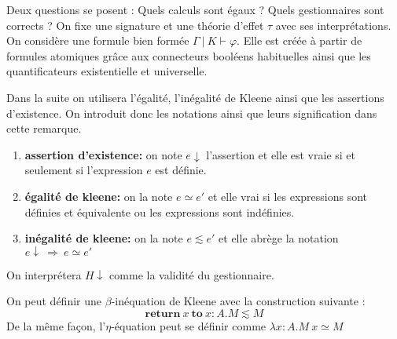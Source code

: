 Deux questions se posent : Quels calculs sont égaux ? Quels gestionnaires sont corrects ?
\smallbreak
On fixe une signature et une théorie d'effet $\tau$ avec ses interprétations. On considère une formule bien formée $\Gamma~|~K \vdash \varphi$. Elle est créée à partir de formules atomiques grâce aux connecteurs booléens habituelles ainsi que les quantificateurs existentielle et universelle.

\begin{remark}
	Dans la suite on utilisera l'égalité, l'inégalité de Kleene ainsi que les assertions d'existence. On introduit donc les notations ainsi que leurs signification dans cette remarque.
	
	\begin{enumerate}
		\item[] \textbf{assertion d'existence:} on note $e \downarrow$ l'assertion et elle est vraie si et seulement si l'expression $e$ est définie.
		\item[] \textbf{égalité de kleene:} on la note $e \simeq e'$ et elle vrai si les expressions sont définies et équivalente ou les expressions sont indéfinies.
		\item[] \textbf{inégalité de kleene:} on la note $e \lesssim e'$ et elle abrège la notation $e \downarrow~\Rightarrow~e \simeq e'$
	\end{enumerate}

	On interprétera $H\downarrow$ comme la validité du gestionnaire. 
\end{remark}
\medbreak

\begin{exemple}
	On peut définir une $\beta$-inéquation de Kleene avec la construction suivante : 
	\[\textbf{return}~x~\textbf{to}~x:A. M \lesssim M\]
	De la même façon, l'$\eta$-équation peut se définir comme
	$\lambda x:A.M~x \simeq M$
\end{exemple}



